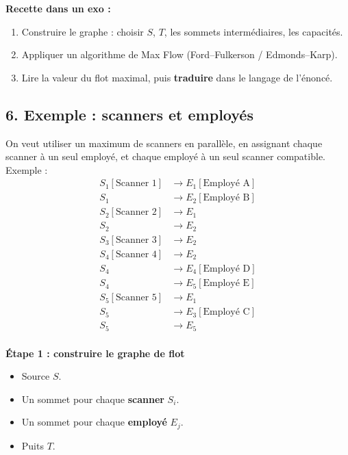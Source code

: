 \textbf{Recette dans un exo :}
\begin{enumerate}
    \item Construire le graphe : choisir $S$, $T$, les sommets intermédiaires, les capacités.
    \item Appliquer un algorithme de Max Flow (Ford–Fulkerson / Edmonds–Karp).
    \item Lire la valeur du flot maximal, puis \textbf{traduire} dans le langage de l’énoncé.
\end{enumerate}

\subsection*{6. Exemple : scanners et employés}

On veut utiliser un maximum de scanners en parallèle, en assignant chaque scanner à un seul employé, et chaque employé à un seul scanner compatible. \\

Exemple :
\begin{align*}
    S_1[\text{Scanner 1}] &\rightarrow E_1[\text{Employé A}] \\
    S_1 &\rightarrow E_2[\text{Employé B}] \\ 
    S_2[\text{Scanner 2}] &\rightarrow E_1  \\
    S_2 &\rightarrow E_2  \\
    S_3[\text{Scanner 3}] &\rightarrow E_2  \\
    S_4[\text{Scanner 4}] &\rightarrow E_2  \\
    S_4 &\rightarrow E_4[\text{Employé D}]  \\
    S_4 &\rightarrow E_5[\text{Employé E}]  \\
    S_5[\text{Scanner 5}] &\rightarrow E_1  \\
    S_5 &\rightarrow E_3[\text{Employé C}]  \\
    S_5 &\rightarrow E_5 \\
\end{align*}

\textbf{Étape 1 : construire le graphe de flot}

\begin{itemize}
    \item Source $S$.
    \item Un sommet pour chaque \textbf{scanner} $S_i$.
    \item Un sommet pour chaque \textbf{employé} $E_j$.
    \item Puits $T$.
\end{itemize}

